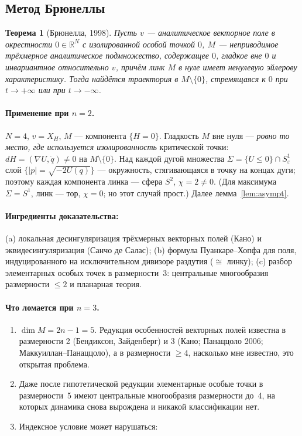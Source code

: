 \documentclass[11pt,a4paper]{article}
\newtheorem{theorem}{Теорема}
\theoremstyle{definition}
\newcommand{\R}{\mathbb R}
\newcommand{\eps}{\varepsilon}
\begin{document}
\subsection{Метод Брюнеллы}\label{sec:brunella}
\begin{theorem}[Брюнелла, 1998]
Пусть $v$ --- аналитическое векторное поле в окрестности $0\in\R^N$ с изолированной особой точкой $0$,
$M$ --- неприводимое трёхмерное аналитическое подмножество, содержащее $0$, гладкое вне $0$ и
инвариантное относительно $v$, причём линк $M$ в нуле имеет ненулевую эйлерову характеристику. Тогда
найдётся траектория в $M\setminus\{0\}$, стремящаяся к $0$ при $t\to+\infty$ или при $t\to-\infty$.
\end{theorem}

\paragraph{Применение при $n=2$.} $N=4$, $v=X_H$, $M$ --- компонента $\{H=0\}$. Гладкость $M$ вне нуля ---
\emph{ровно то место, где используется изолированность} критической точки: $dH=(\nabla U,\dot q)\ne0$
на $M\setminus\{0\}$. Над каждой дугой множества $\Sigma=\{U\le0\}\cap S^1_\eps$ слой
$\{|p|=\sqrt{-2U(q)}\}$ --- окружность, стягивающаяся в точку на концах дуги; поэтому каждая компонента
линка --- сфера $S^2$, $\chi=2\ne0$. (Для максимума $\Sigma=S^1$, линк --- тор, $\chi=0$; но этот случай
прост.) Далее лемма~\ref{lem:asympt}.

\paragraph{Ингредиенты доказательства:} (a) локальная десингуляризация трёхмерных векторных полей
(Кано) и эквидесингуляризация (Санчо де Салас); (b) формула Пуанкаре--Хопфа для поля, индуцированного на
исключительном дивизоре раздутия ($\cong$ линку); (c) разбор элементарных особых точек в размерности~3:
центральные многообразия размерности $\le2$ и планарная теория.

\paragraph{Что ломается при $n=3$.}
\begin{enumerate}[leftmargin=*]
\item $\dim M=2n-1=5$. Редукция особенностей векторных полей известна в размерности 2 (Бендиксон,
Зайденберг) и 3 (Кано; Панаццоло 2006; Маккуиллан--Панаццоло), а в размерности $\ge4$, насколько мне
известно, это открытая проблема.
\item Даже после гипотетической редукции элементарные особые точки в размерности~5 имеют центральные
многообразия размерности до~4, на которых динамика снова вырождена и никакой классификации нет.
\item Индексное условие может нарушаться:
\end{enumerate}
\end{document}
